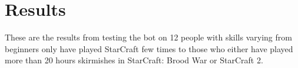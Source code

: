 \chapter{Results}
These are the results from testing the bot on 12 people with skills varying from beginners only have played StarCraft few times to those who either have played more than 20 hours skirmishes in StarCraft: Brood War or StarCraft 2.